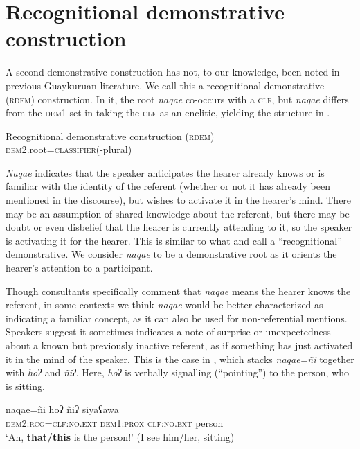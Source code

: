 \documentclass[output=paper,colorlinks,citecolor=brown]{langscibook}
\begin{document}
\section{Recognitional demonstrative construction}\label{sec:payne:6}

A second demonstrative construction has not, to our knowledge, been noted in previous Guaykuruan literature. We call this a recognitional demonstrative (\textsc{rdem}) construction. In it, the root \textit{naqae} co-occurs with a \textsc{clf,} but \textit{naqae} differs from the \textsc{dem1} set in taking the \textsc{clf} as an enclitic, yielding the structure in .

\ea\label{ex:payne:69}
 Recognitional demonstrative construction (\textsc{rdem})\\
\textsc{dem2}.root=\textsc{classifier}(-plural)\\
\z

\textit{Naqae} indicates that the speaker anticipates the hearer already knows or is familiar with the identity of the referent (whether or not it has already been mentioned in the discourse), but wishes to activate it in the hearer’s mind. There may be an assumption of shared knowledge about the referent, but there may be doubt or even disbelief that the hearer is currently attending to it, so the speaker is activating it for the hearer. This is similar to what \citet{Himmelmann1996} and \citet{Diessel1999Book} call a “recognitional” demonstrative. We consider \textit{naqae} to be a demonstrative root as it orients the hearer’s attention to a participant.

Though consultants specifically comment that \textit{naqae} means the hearer knows the referent, in some contexts we think \textit{naqae} would be better characterized as indicating a familiar concept, as it can also be used for non-referential mentions. Speakers suggest it sometimes indicates a note of surprise or unexpectedness about a known but previously inactive referent, as if something has just activated it in the mind of the speaker. This is the case in , which stacks \textit{naqae=ñi} together with \textit{hoʔ} and \textit{ñiʔ}. Here, \textit{hoʔ} is verbally signalling (“pointing”) to the person, who is sitting. 

\ea\label{ex:payne:70}
\gll  naqae=ñi  hoʔ  ñiʔ  siyaʕawa\\
 \textsc{dem2:rcg=clf:no.ext}  \textsc{dem1:prox}  \textsc{clf:no.ext}  person\\
\glt ‘Ah, \textbf{that/this} is the person!’ (I see him/her, sitting)
\z
\end{document}
